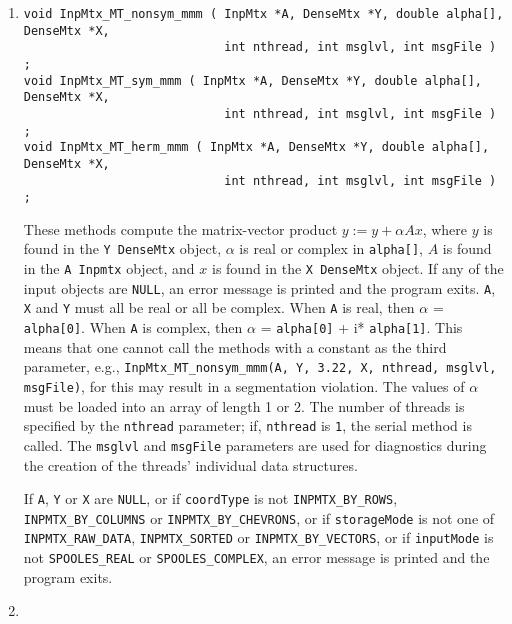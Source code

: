 \begin{enumerate}
\item
\begin{verbatim}
void InpMtx_MT_nonsym_mmm ( InpMtx *A, DenseMtx *Y, double alpha[], DenseMtx *X,
                            int nthread, int msglvl, int msgFile ) ;
void InpMtx_MT_sym_mmm ( InpMtx *A, DenseMtx *Y, double alpha[], DenseMtx *X,
                            int nthread, int msglvl, int msgFile ) ;
void InpMtx_MT_herm_mmm ( InpMtx *A, DenseMtx *Y, double alpha[], DenseMtx *X,
                            int nthread, int msglvl, int msgFile ) ;
\end{verbatim}
These methods compute the matrix-vector product $y := y + \alpha A x$,
where $y$ is found in the {\tt Y DenseMtx} object,
$\alpha$ is real or complex in {\tt alpha[]},
$A$ is found in the {\tt A Inpmtx} object, and
$x$ is found in the {\tt X DenseMtx} object.
If any of the input objects are {\tt NULL}, an error message is
printed and the program exits.
{\tt A}, {\tt X} and {\tt Y} must all be real or all be complex.
When {\tt A} is real, then $\alpha$ = {\tt alpha[0]}.
When {\tt A} is complex, then $\alpha$ = 
{\tt alpha[0]} + i* {\tt alpha[1]}.
This means that one cannot call the methods with a constant as the
third parameter, e.g.,
{\tt InpMtx\_MT\_nonsym\_mmm(A, Y, 3.22, X, nthread, msglvl, msgFile)},
for this may result in a segmentation violation.
The values of $\alpha$ must be loaded into an array of length 1 or 2.
The number of threads is specified by the {\tt nthread} parameter;
if, {\tt nthread} is {\tt 1}, the serial method is called.
The {\tt msglvl} and {\tt msgFile} parameters are used for
diagnostics during the creation of the threads' individual data
structures.
\par {}
If {\tt A}, {\tt Y} or {\tt X} are {\tt NULL},
or if {\tt coordType} is not {\tt INPMTX\_BY\_ROWS},
{\tt INPMTX\_BY\_COLUMNS} or {\tt INPMTX\_BY\_CHEVRONS},
or if {\tt storageMode} is not one of {\tt INPMTX\_RAW\_DATA},
{\tt INPMTX\_SORTED} or {\tt INPMTX\_BY\_VECTORS},
or if {\tt inputMode} is not {\tt SPOOLES\_REAL} or
{\tt SPOOLES\_COMPLEX},
an error message is printed and the program exits.
\item
\begin{verbatim}

\end{verbatim}
\end{enumerate}
